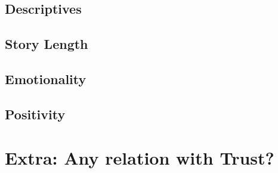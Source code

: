 \subsection{Descriptives}
\subsection{Story Length}
\subsection{Emotionality}
\subsection{Positivity}

\section{Extra: Any relation with Trust?}
